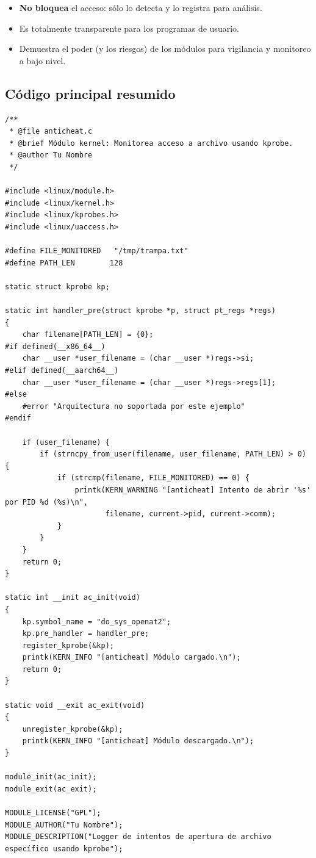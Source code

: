 \begin{itemize}
    \item \textbf{No bloquea} el acceso: sólo lo detecta y lo registra para análisis.
    \item Es totalmente transparente para los programas de usuario.
    \item Demuestra el poder (y los riesgos) de los módulos para vigilancia y monitoreo a bajo nivel.
\end{itemize}
\newpage
\subsection{Código principal resumido}

\begin{verbatim}
/**
 * @file anticheat.c
 * @brief Módulo kernel: Monitorea acceso a archivo usando kprobe.
 * @author Tu Nombre
 */

#include <linux/module.h>
#include <linux/kernel.h>
#include <linux/kprobes.h>
#include <linux/uaccess.h>

#define FILE_MONITORED   "/tmp/trampa.txt"
#define PATH_LEN        128

static struct kprobe kp;

static int handler_pre(struct kprobe *p, struct pt_regs *regs)
{
    char filename[PATH_LEN] = {0};
#if defined(__x86_64__)
    char __user *user_filename = (char __user *)regs->si;
#elif defined(__aarch64__)
    char __user *user_filename = (char __user *)regs->regs[1];
#else
    #error "Arquitectura no soportada por este ejemplo"
#endif

    if (user_filename) {
        if (strncpy_from_user(filename, user_filename, PATH_LEN) > 0) {
            if (strcmp(filename, FILE_MONITORED) == 0) {
                printk(KERN_WARNING "[anticheat] Intento de abrir '%s' por PID %d (%s)\n",
                       filename, current->pid, current->comm);
            }
        }
    }
    return 0;
}

static int __init ac_init(void)
{
    kp.symbol_name = "do_sys_openat2";
    kp.pre_handler = handler_pre;
    register_kprobe(&kp);
    printk(KERN_INFO "[anticheat] Módulo cargado.\n");
    return 0;
}

static void __exit ac_exit(void)
{
    unregister_kprobe(&kp);
    printk(KERN_INFO "[anticheat] Módulo descargado.\n");
}

module_init(ac_init);
module_exit(ac_exit);

MODULE_LICENSE("GPL");
MODULE_AUTHOR("Tu Nombre");
MODULE_DESCRIPTION("Logger de intentos de apertura de archivo específico usando kprobe");
\end{verbatim}


